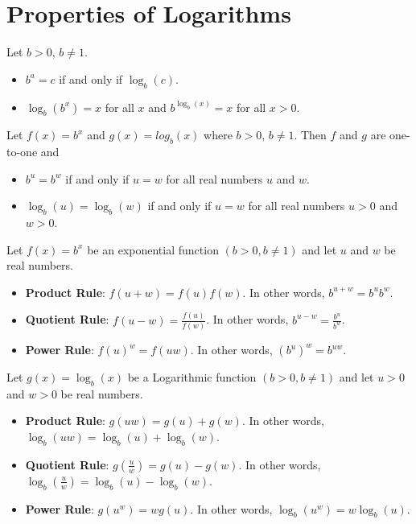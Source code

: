 \section{Properties of Logarithms}

\begin{theorem}
    Let $b>0$, $b \neq 1$.
    \begin{itemize}
        \item $b^a = c$ if and only if $\log_{b}(c)$.
        \item $\log_{b}(b^x)=x$ for all $x$ and $b^{\log_{b}(x)}=x$ for all $x > 0$.
    \end{itemize}
\end{theorem}

\begin{theorem}
    Let $f(x) = b^x$ and $g(x)=log_{b}(x)$ where $b>0$, $b \neq 1$. Then $f$ and $g$ are one-to-one and
    \begin{itemize}
        \item $b^u=b^w$ if and only if $u=w$ for all real numbers $u$ and $w$.
        \item $\log_{b}(u) = \log_{b}(w)$ if and only if $u=w$ for all real numbers $u>0$ and $w>0$.
    \end{itemize}
\end{theorem}

\begin{theorem}
    Let $f(x)=b^x$ be an exponential function $(b>0, b\neq 1)$ and let $u$ and $w$ be real numbers.
    \begin{itemize}
        \item \textbf{Product Rule}: $f(u+w) = f(u)f(w)$. In other words, $b^{u+w}=b^u b^w$.
        \item \textbf{Quotient Rule}: $f(u-w) = \frac{f(u)}{f(w)}$. In other words, $b^{u-w}=\frac{b^u}{b^w}$.
        \item \textbf{Power Rule}: $f(u)^w = f(uw)$. In other words, $(b^u)^w=b^{uw}$.
    \end{itemize}
\end{theorem}

\begin{theorem}
    Let $g(x)=\log_{b}(x)$ be a Logarithmic function $(b>0, b\neq 1)$ and let $u>0$ and $w>0$ be real numbers.
    \begin{itemize}
        \item \textbf{Product Rule}: $g(uw) = g(u)+g(w)$. In other words, $\log_{b}(uw) = \log_{b}(u) + \log_{b}(w)$.
        \item \textbf{Quotient Rule}: $g(\frac{u}{w}) = g(u)-g(w)$. In other words, $\log_{b}(\frac{u}{w})=\log_{b}(u)-\log_{b}(w)$.
        \item \textbf{Power Rule}: $g(u^w) = wg(u)$. In other words, $\log_{b}(u^w)= w \log_{b}(u)$.
    \end{itemize}
\end{theorem}

